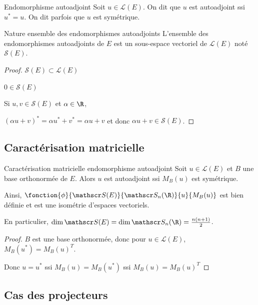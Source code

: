 \begin{definition}{Endomorphisme autoadjoint}{}
    Soit $u \in \mathscr L(E)$. On dit que $u$ est autoadjoint ssi $u^* = u$.
    On dit parfois que $u$ est symétrique. 
\end{definition}

\begin{theoreme}{Nature ensemble des endomorphismes autoadjoints}{}
    L'ensemble des endomorphismes autoadjoints de $E$ est un sous-espace vectoriel
    de $\mathscr L(E)$ noté $\mathscr S(E)$. 
\end{theoreme}

\begin{proof}
    $\mathscr S(E) \subset \mathscr L(E)$

    $0 \in \mathscr S(E)$ 

    Si $u, v \in \mathscr S(E)$ et $\alpha \in \R$, 

    $(\alpha u + v)^* = \alpha u^* + v^* = \alpha u + v$ et donc $\alpha u + v \in \mathscr S(E)$.
\end{proof}

\subsection{Caractérisation matricielle}

\begin{proposition}{Caractérisation matricielle endomorphisme autoadjoint}{}
    Soit $u \in \mathscr L(E)$ et $B$ une base orthonormée de $E$. 
    Alors $u$ est autoadjoint ssi $M_B(u)$ est 
    symétrique. 
    
    Ainsi, $\fonction{\phi}{\mathscr S(E)}{\mathscr S_n(\R)}{u}{M_B(u)}$ 
    est bien définie et est une isométrie d'espaces vectoriels. 

    En particulier, $\dim \mathscr S(E) = \dim \mathscr S_n(\R) = \frac{n(n + 1)}{2}$.
\end{proposition}

\begin{proof}
    $B$ est une base orthonormée, donc pour $u \in \mathscr L(E)$, 
    $M_B(u^*) = M_B(u)^T$.

    Donc $u = u^*$ ssi $M_B(u) = M_B(u^*)$ ssi $M_B(u) = M_B(u)^T$ 
\end{proof}

\subsection{Cas des projecteurs }

